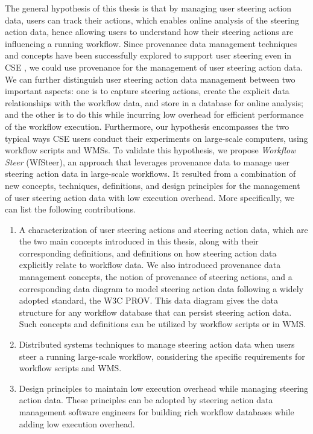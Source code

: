 The general hypothesis of this thesis is that by 
managing user steering action data,
users can track their actions, which enables online analysis of the steering action data, hence allowing users to understand how their steering actions are influencing a running workflow. 
Since provenance data management techniques and concepts have been successfully explored to support user steering even in CSE \cite{Silva2017Raw, Silva2018Capturing, souza_keeping_2019}, we could use provenance for the management of user steering action data. 
We can further distinguish user steering action data management between two important aspects: one is to capture steering actions, create the explicit data relationships with the workflow data, and store in a database for online analysis; and the other is to do this while incurring low overhead for efficient performance of the workflow execution. Furthermore, our hypothesis encompasses the two typical ways CSE users conduct their experiments
on large-scale computers, \ie{} using workflow scripts and WMSs. 
To validate this hypothesis, we propose 
\textit{Workflow Steer} (WfSteer), an approach that leverages provenance data to manage user steering action data in large-scale workflows.
It resulted from a combination of new concepts, techniques, definitions, and design principles for the management of user steering action data with low execution overhead. More specifically, we can list the following contributions.

\begin{enumerate}[label=(\Roman*),itemsep=0pt]

    \item 
    A characterization of user steering actions and steering action data, which are the two main concepts introduced in this thesis, along with their corresponding definitions, and definitions on how steering action data explicitly relate to workflow data.
    We also introduced provenance data management concepts, the notion of provenance of steering actions, and a corresponding data diagram to model steering action data following a widely adopted standard, the W3C PROV. This data diagram gives the data structure for any workflow database that can persist steering action data. Such concepts and definitions can be utilized by workflow scripts or in WMS.

    \item
    Distributed systems techniques to manage steering action data when users steer a running large-scale workflow, considering the specific requirements for workflow scripts and WMS.

    \item Design principles to maintain low execution overhead while managing steering action data.
    These principles can be adopted by steering action data management software engineers for building rich workflow databases while adding low execution overhead.

\end{enumerate}


